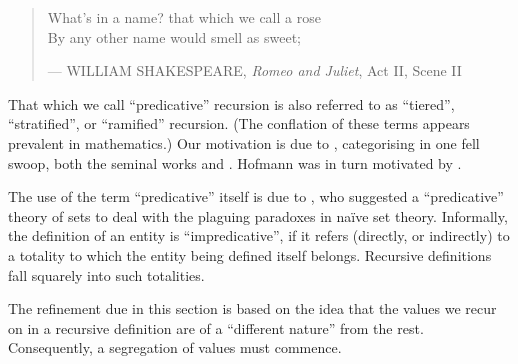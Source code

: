 \begin{quotation}

\footnotesize\sffamily\itshape

\begin{flushright}

What's in a name? that which we call a rose \\
By any other name would smell as sweet;

\smallbreak

\upshape

--- WILLIAM SHAKESPEARE, \emph{Romeo and Juliet}, Act II, Scene II

\end{flushright}

\end{quotation}

That which we call ``predicative'' recursion is also referred to as
``tiered''\cite{leivant-1990}, ``stratified''\cite{leivant-1993}, or
``ramified''\cite{leivant-1995} recursion. (The conflation of these terms
appears prevalent in mathematics.) Our motivation is due to
\cite{hofmann-2000a}, categorising in one fell swoop, both the seminal works
\cite{bellantoni-cook-1992} and \cite{leivant-1995}. Hofmann was in turn
motivated by \cite{bellantoni-phd-1992}.

The use of the term ``predicative'' itself is due to \cite{russell-1907}, who
suggested a ``predicative'' theory of sets to deal with the plaguing paradoxes
in na\"ive set theory. Informally, the definition of an entity is
``impredicative''\cite{goedel-1944}, if it refers (directly, or indirectly) to
a totality to which the entity being defined itself belongs. Recursive
definitions fall squarely into such totalities. 

The refinement due in this section is based on the idea that the values we
recur on in a recursive definition are of a ``different nature'' from the
rest\cite{caseiro-1996}. Consequently, a segregation of values must commence.




